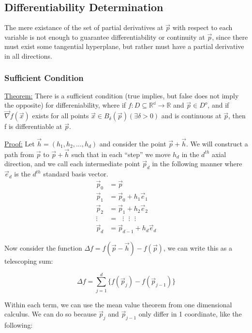 \documentclass[11 pt, twoside]{article}
\begin{document}
\subsection{Differentiability Determination}

The mere existance of the set of partial derivatives at $\vec{p}$ with respect to each variable is not enough to guarantee differentiability or continuity at $\vec{p}$, since there must exist some tangential hyperplane, but rather must have a partial derivative in all directions.

\subsubsection{Sufficient Condition}

\underline{Theorem:}
There is a sufficient condition (true implies, but false does not imply the opposite) for differeniability, where if $f: D \subseteq \mathbb{R^d} \to \mathbb{R}$ and $\vec{p} \in D^o$, and if $\vec{\nabla}f(\vec{x})$ exists for all points $\vec{x} \in B_\delta (\vec{p}) (\exists \delta > 0)$ and is continuous at $\vec{p}$, then f is differentiable at $\vec{p}$.

\underline{Proof:}
Let $\vec{h} = (h_1, h_2, \dots, h_d)$ and consider the point $\vec{p} +
\vec{h}$. We will construct a path from $\vec{p}$ to $\vec{p} + \vec{h}$ such
that in each ``step'' we move $h_d$ in the $d^{th}$ axial direction, and we call
each intermediate point $\vec{p}_d$ in the following manner where $\vec{e}_d$ is
the $d^{th}$ standard basis vector.
\begin{align*}
    \vec{p}_0 &= \vec{p}\\
    \vec{p}_1 &= \vec{p}_0 + h_1 \vec{e}_1\\
    \vec{p}_2 &= \vec{p}_1 + h_2 \vec{e}_2\\
    \vdots &= \text{     } \vdots \text{     } \vdots \text{     } \vdots\\
    \vec{p}_d &= \vec{p}_{d-1} + h_d \vec{e}_d
\end{align*}

Now consider the function $\Delta f = f(\vec{p} - \vec{h}) - f(\vec{p})$, we can
write this as a telescoping sum:

$$\Delta f = \sum_{j=1}^d \{f(\vec{p}_j) - f(\vec{p}_{j-1})\}$$

Within each term, we can use the mean value theorem from one dimensional
calculus. We can do so because $\vec{p}_j$ and $\vec{p}_{j - 1}$ only differ in
1 coordinate, like the following:
\end{document}
